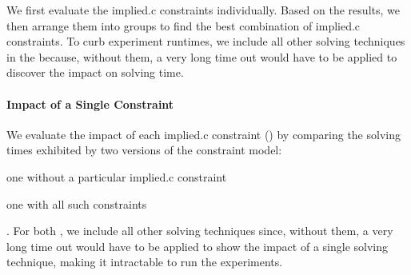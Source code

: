 \newsavebox{\solvTechPlot}
\newlength{\solvTechPlotW}
\newlength{\solvTechSubfigW}


We first evaluate the \gls{implied.c} \glspl{constraint} individually.
%
Based on the results, we then arrange them into groups to find the best
combination of \gls{implied.c} \glspl{constraint}.
%
To curb experiment runtimes, we include all other solving techniques in the
 because, without them, a very long time out would
have to be applied to discover the impact on solving time.


\paragraph{Impact of a Single Constraint}

We evaluate the impact of each \gls{implied.c} \gls{constraint}
()
by comparing the solving times exhibited by two versions of the \gls{constraint
  model}:
%
\begin{modelList}
  \item {}
    one without a particular \gls{implied.c} \gls{constraint}
  \item {}
    one with all such \glspl{constraint}
\end{modelList}.
%
For both , we include all other solving techniques
since, without them, a very long time out would have to be applied to show the
impact of a single solving technique, making it intractable to run the
experiments.

